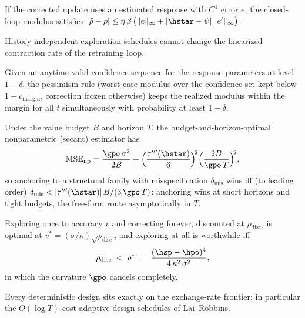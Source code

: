 \documentclass[11pt]{article}
\begin{document}
\begin{lemma}
If the corrected update uses an estimated response with $C^1$ error $e$,
the closed-loop modulus satisfies
$|\hat\rho - \rho| \le \eta\,\beta\,\big(\|e\|_\infty +
|\hstar-\psi|\,\|e'\|_\infty\big)$.
\end{lemma}

\begin{remark}
History-independent exploration schedules cannot change the linearized
contraction rate of the retraining loop.
\end{remark}

\begin{proposition}
Given an anytime-valid confidence sequence for the response parameters at
level $1-\delta$, the pessimism rule (worst-case modulus over the
confidence set kept below $1 - c_{\mathrm{margin}}$, correction frozen
otherwise) keeps the realized modulus within the margin for all $t$
simultaneously with probability at least $1-\delta$.
\end{proposition}

\begin{theorem}
Under the value budget $B$ and horizon $T$, the budget-and-horizon-optimal
nonparametric (secant) estimator has
\[
\mathrm{MSE}_{\mathrm{np}} = \frac{\gpo\,\sigma^2}{2B}
+ \Big(\frac{\tau'''(\hstar)}{6}\Big)^{\!2}
\Big(\frac{2B}{\gpo\,T}\Big)^{\!2},
\]
so anchoring to a structural family with misspecification
$\delta_{\mathrm{mis}}$ wins iff (to leading order)
$\delta_{\mathrm{mis}} < |\tau'''(\hstar)|\,B/(3\,\gpo\,T)$: anchoring wins
at short horizons and tight budgets, the free-form route asymptotically in
$T$.
\end{theorem}

\begin{theorem}
Exploring once to accuracy $v$ and correcting forever, discounted at
$\rho_{\mathrm{disc}}$, is optimal at
$v^{*} = (\sigma/\kappa)\sqrt{\rho_{\mathrm{disc}}}$, and exploring at all
is worthwhile iff
\[
\rho_{\mathrm{disc}} \;<\; \rho^{*} \;=\;
\frac{(\hsp - \hpo)^4}{4\,\kappa^2\,\sigma^2},
\]
in which the curvature $\gpo$ cancels completely.
\end{theorem}

\begin{proposition}
Every deterministic design sits exactly on the exchange-rate frontier; in
particular the $O(\log T)$-cost adaptive-design schedules of Lai--Robbins.
\end{proposition}
\end{document}
